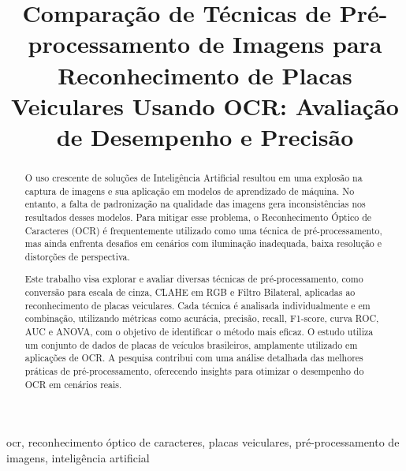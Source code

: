 \documentclass[conference]{IEEEtran}
\begin{document}
\title{Comparação de Técnicas de Pré-processamento de Imagens para Reconhecimento de Placas Veiculares Usando OCR: Avaliação de Desempenho e Precisão}

\author{

\and
{}
}

\maketitle

\begin{abstract}
O uso crescente de soluções de Inteligência Artificial resultou em uma explosão na captura de imagens e sua aplicação em modelos de aprendizado de máquina. No entanto, a falta de padronização na qualidade das imagens gera inconsistências nos resultados desses modelos. Para mitigar esse problema, o Reconhecimento Óptico de Caracteres (OCR) é frequentemente utilizado como uma técnica de pré-processamento, mas ainda enfrenta desafios em cenários com iluminação inadequada, baixa resolução e distorções de perspectiva.

Este trabalho visa explorar e avaliar diversas técnicas de pré-processamento, como conversão para escala de cinza, CLAHE em RGB e Filtro Bilateral, aplicadas ao reconhecimento de placas veiculares. Cada técnica é analisada individualmente e em combinação, utilizando métricas como acurácia, precisão, recall, F1-score, curva ROC, AUC e ANOVA, com o objetivo de identificar o método mais eficaz. O estudo utiliza um conjunto de dados de placas de veículos brasileiros, amplamente utilizado em aplicações de OCR. A pesquisa contribui com uma análise detalhada das melhores práticas de pré-processamento, oferecendo insights para otimizar o desempenho do OCR em cenários reais.
\end{abstract}

\begin{IEEEkeywords} 
ocr, reconhecimento óptico de caracteres, placas veiculares, pré-processamento de imagens, inteligência artificial
\end{IEEEkeywords}
\end{document}
